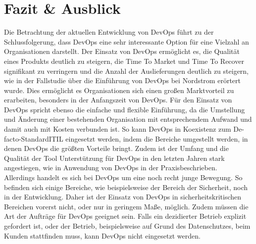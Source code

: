\section{Fazit \& Ausblick}

\begin{comment}
++++++++++++
Zudem sollte der Schlussteil immer eine Interpretation und Bewertung der Forschungsergebnisse enthalten: Was leisten die Ergebnisse? Haben sich durch Ihre Hausarbeit (Forschungs-)Fragen ergeben, die noch geklärt werden müssen (sog. Ausblick)?

Stand der Dinge in Sachen DevOps? Kann es sich durchsetzen und halten?



Schlussfolgerungen.

Handlungsempfehlungen für die Praxis!
++++++++++++
\end{comment}

Die Betrachtung der aktuellen Entwicklung von DevOps führt zu der Schlussfolgerung, dass DevOps eine sehr interessante Option für eine Vielzahl an Organisationen darstellt. Der Einsatz von DevOps ermöglicht es, die Qualität eines Produkts deutlich zu steigern, die Time To Market und Time To Recover signifikant zu verringern und die Anzahl der Auslieferungen deutlich zu steigern, wie in der Fallstudie über die Einführung von DevOps bei Nordstrom erörtert wurde. Dies ermöglicht es Organisationen sich einen großen Marktvorteil zu erarbeiten, besonders in der Anfangszeit von DevOps. 
Für den Einsatz von DevOps spricht ebenso die einfache und flexible Einführung, da die Umstellung und Änderung einer bestehenden Organisation mit entsprechendem Aufwand und damit auch mit Kosten verbunden ist. So kann DevOps in Koexistenz zum \glqq De-facto-Standard\grqq ITIL eingesetzt werden, indem die Bereiche umgestellt werden, in denen DevOps die größten Vorteile bringt. Zudem ist der Umfang und die Qualität der Tool Unterstützung für DevOps in den letzten Jahren stark angestiegen, wie in \glqq Anwendung von DevOps in der Praxis\grqq beschrieben.\\
Allerdings handelt es sich bei DevOps um eine noch recht junge Bewegung. So befinden sich einige Bereiche, wie beispielsweise der Bereich der Sicherheit, noch in der Entwicklung. Daher ist der Einsatz von DevOps in sicherheitskritischen Bereichen vorerst nicht, oder nur in geringem Maße, möglich. Zudem müssen die Art der Aufträge für DevOps geeignet sein. Falls ein dezidierter Betrieb explizit gefordert ist, oder der Betrieb, beispielsweise auf Grund des Datenschutzes, beim Kunden stattfinden muss, kann DevOps nicht eingesetzt werden.

